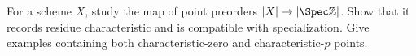 \begin{problem}\label{chal:vi21-c04}
For a scheme $X$, study the map of point preorders $|X|\to|\Spec\mathbb Z|$.  Show that it records residue characteristic and is compatible with specialization.  Give examples containing both characteristic-zero and characteristic-$p$ points.
\end{problem}
